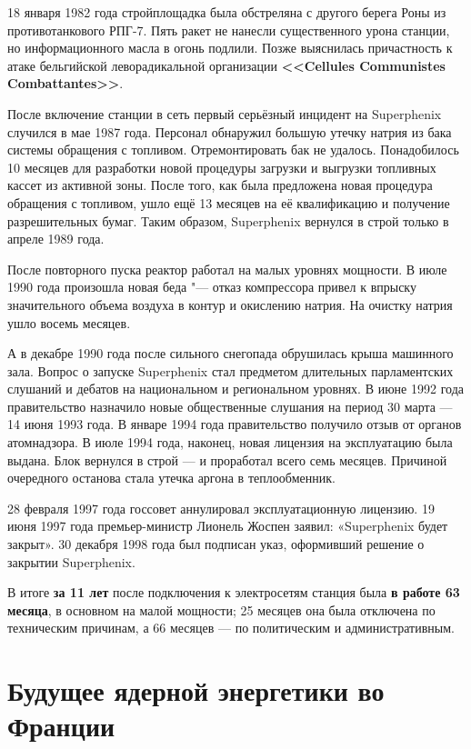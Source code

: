 18 января 1982 года стройплощадка была обстреляна с другого берега Роны из противотанкового РПГ-7. Пять ракет не нанесли существенного урона станции, но информационного масла в огонь подлили. Позже выяснилась причастность к атаке бельгийской леворадикальной организации \textbf{<<Cellules Communistes Combattantes>>}.

После включение станции в сеть первый серьёзный инцидент на Superphenix случился в мае 1987 года. Персонал обнаружил большую утечку натрия из бака системы обращения с топливом. Отремонтировать бак не удалось. Понадобилось 10 месяцев для разработки новой процедуры загрузки и выгрузки топливных кассет из активной зоны. После того, как была предложена новая процедура обращения с топливом, ушло ещё 13 месяцев на её квалификацию и получение разрешительных бумаг. Таким образом, Superphenix вернулся в строй только в апреле 1989 года.

После повторного пуска реактор работал на малых уровнях мощности. В июле 1990 года произошла новая беда "--- отказ компрессора привел к впрыску значительного объема воздуха в контур и окислению натрия. На очистку натрия ушло восемь месяцев.

А в декабре 1990 года после сильного снегопада обрушилась крыша машинного зала. Вопрос о запуске Superphenix стал предметом длительных парламентских слушаний и дебатов на национальном и региональном уровнях. В июне 1992 года правительство назначило новые общественные слушания на период 30 марта — 14 июня 1993 года. В январе 1994 года правительство получило отзыв от органов атомнадзора. В июле 1994 года, наконец, новая лицензия на эксплуатацию была выдана. Блок вернулся в строй — и проработал всего семь месяцев. Причиной очередного останова стала утечка аргона в теплообменник.

28 февраля 1997 года госсовет аннулировал эксплуатационную лицензию. 19 июня 1997 года премьер-министр Лионель Жоспен заявил: «Superphenix будет закрыт». 30 декабря 1998 года был подписан указ, оформивший решение о закрытии Superphenix.

В итоге \textbf{за 11 лет} после подключения к электросетям станция была \textbf{в работе 63 месяца}, в основном на малой мощности; 25 месяцев она была отключена по техническим причинам, а 66 месяцев — по политическим и административным.

\section{Будущее ядерной энергетики во Франции}

